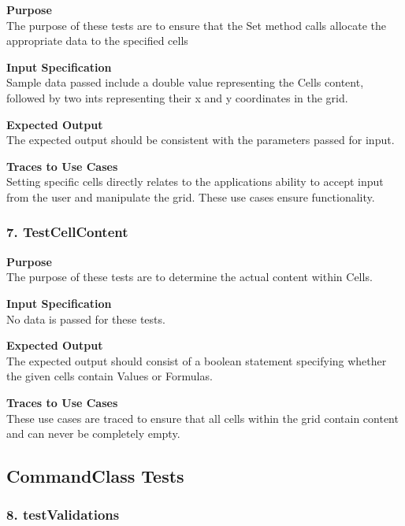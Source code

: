 \documentclass[12pt]{article}
\begin{document}
\noindent
{\bf Purpose}\\
The purpose of these tests are to ensure that the Set method calls allocate the appropriate data to the specified cells

\noindent
{\bf Input Specification}\\
Sample data passed include a double value representing the Cells content, followed by two ints representing their x and y coordinates in the grid. 

\noindent
{\bf Expected Output}\\
The expected output should be consistent with the parameters passed for input. 

\noindent
{\bf Traces to Use Cases}\\
Setting specific cells directly relates to the applications ability to accept input from the user and manipulate the grid. These use cases ensure functionality.

\subsubsection{7. TestCellContent} \label{tc:1}

\noindent
{\bf Purpose}\\
The purpose of these tests are to determine the actual content within Cells. 

\noindent
{\bf Input Specification}\\
No data is passed for these tests. 

\noindent
{\bf Expected Output}\\
The expected output should consist of a boolean statement specifying whether the given cells contain Values or Formulas. 

\noindent
{\bf Traces to Use Cases}\\
These use cases are traced to ensure that all cells within the grid contain content and can never be completely empty. 

\subsection{CommandClass Tests}

\subsubsection{8. testValidations} \label{tc:1}
\end{document}
